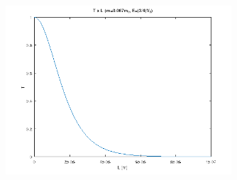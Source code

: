 \begin{figure}[H] \centering
	\includegraphics[width=0.75\textwidth]{../images/q2d.png}
	\label{fig:q2d}
\end{figure}
